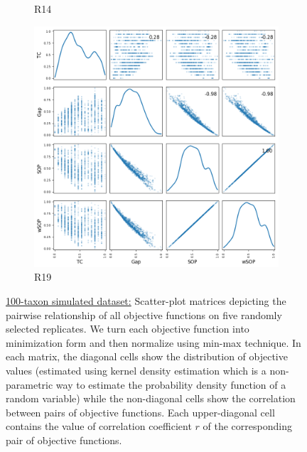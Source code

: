 \begin{figure}[!htbp]
\begin{adjustwidth}{-1cm}{-1cm}
\begin{subfigure}{0.35\textwidth}
			\caption{R14}
		\end{subfigure}
		\begin{subfigure}{0.35\textwidth}
			\includegraphics[width=\columnwidth]{Figure/NumGaps_SOP_TC_wSOP/precomputedInit/R19/fig/scatter_mattrix}
			\caption{R19}
		\end{subfigure}
		\caption{\underline{100-taxon simulated dataset:} Scatter-plot matrices depicting the pairwise relationship of all objective functions on five randomly selected replicates. We turn each objective function into minimization form and then normalize using min-max technique. In each matrix, the diagonal cells show the distribution of objective values (estimated using kernel density estimation which is a non-parametric way to estimate the probability density function of a random variable) while the non-diagonal cells show the correlation between pairs of objective functions. Each upper-diagonal cell contains the value of correlation coefficient $r$ of the corresponding pair of objective functions.}
		\label{fig:nature_obj}
	\end{adjustwidth}
\end{figure}

